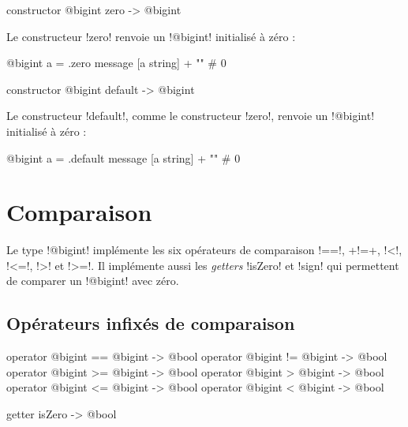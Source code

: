 
\begin{galgas3box}
constructor @bigint zero -> @bigint
\end{galgas3box}

Le constructeur \ggst!zero! renvoie un \ggst!@bigint! initialisé à zéro :
\begin{galgas3}
@bigint a = .zero
message [a string] + "\n" # 0
\end{galgas3}



\begin{galgas3box}
constructor @bigint default -> @bigint
\end{galgas3box}

Le constructeur \ggst!default!, comme le constructeur \ggst!zero!, renvoie un \ggst!@bigint! initialisé à zéro :
\begin{galgas3}
@bigint a = .default
message [a string] + "\n" # 0
\end{galgas3}











\section{Comparaison}

Le type \ggst!@bigint! implémente les six opérateurs de comparaison \ggst!==!, \ggst+!=+, \ggst!<!, \ggst!<=!, \ggst!>! et \ggst!>=!. Il implémente aussi les \emph{getters} \ggst!isZero! et \ggst!sign! qui permettent de comparer un \ggst!@bigint! avec zéro.

\subsection{Opérateurs infixés de comparaison}

\begin{galgas3box}
operator @bigint == @bigint -> @bool
operator @bigint != @bigint -> @bool
operator @bigint >= @bigint -> @bool
operator @bigint >  @bigint -> @bool
operator @bigint <= @bigint -> @bool
operator @bigint <  @bigint -> @bool
\end{galgas3box}


\begin{galgas3box}
getter isZero -> @bool
\end{galgas3box}

